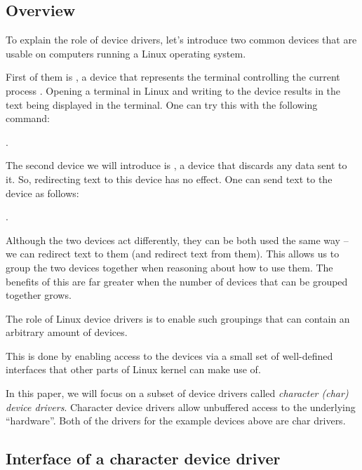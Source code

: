 \documentclass[..thesis.tex]{subfiles}
\begin{document}
\subsection{Overview}



To explain the role of device drivers, let's introduce two common devices that are usable on computers running a Linux operating system.

First of them is , a device that represents the terminal controlling the current process \cite{torvalds_linux}.
Opening a terminal in Linux and writing to the device results in the text being displayed in the terminal. One can try this with the following command: 

.
 
The second device we will introduce is , a device that discards any data sent to it. So, redirecting text to this device has no effect.
One can send text to the device as follows:

.

Although the two devices act differently, they can be both used the same way -- we can redirect text to them (and redirect text from them).
This allows us to group the two devices together when reasoning about how to use them. The benefits of this are far greater when the number of devices that can be grouped together grows.

The role of Linux device drivers is to enable such groupings that can contain an arbitrary amount of devices.

This is done by enabling access to the devices via a small set of well-defined interfaces that other parts of Linux kernel can make use of. 

In this paper, we will focus on a subset of device drivers called \textit{character (char) device drivers}.
Character device drivers allow unbuffered access to the underlying ``hardware''. Both of the drivers for the example devices above are char drivers.

\subsection{Interface of a character device driver}
\end{document}
